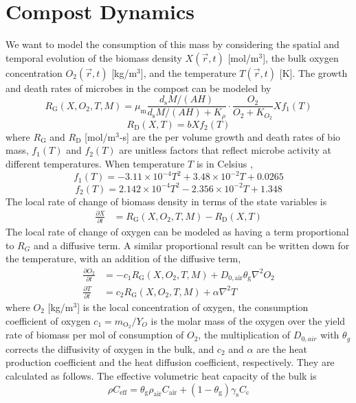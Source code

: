 \documentclass[12pt, letterpaper, titlepage]{article}
\begin{document}
\section{Compost Dynamics}
We want to model the consumption of this mass by considering the spatial and temporal evolution of the biomass density $X(\vec{r}, t)$ [mol/m$^3$], the bulk oxygen concentration $O_2(\vec{r}, t)$ [kg/m$^3$], and the temperature $T(\vec{r}, t)$ [K].
The growth and death rates of microbes in the compost can be modeled by \cite{lin}
$$R_{\mathrm{G}}(X, O_2, T, M) = \mu_{\mathrm{m}}\frac{d_{\mathrm{s}}M/(AH)}{d_{\mathrm{s}}M/(AH)+K_{\rho}}\cdot\frac{O_2}{O_2+K_{O_2}}Xf_1(T)$$
$$R_{\mathrm{D}}(X, T) = bXf_2(T)$$
where $R_{\mathrm{G}}$ and $R_{\mathrm{D}}$ [mol/m$^3$-s] are the per volume growth and death rates of bio mass, $f_1(T)$ and $f_2(T)$ are unitless factors that reflect microbe activity at different temperatures. When temperature $T$ is in Celsius \cite{lin}, 
$$f_1(T) = -3.11 \times 10^{-4}T^2+3.48\times10^{-2}T+0.0265$$
$$f_2(T) = 2.142\times 10^{-4}T^2-2.356\times10^{-2}T+1.348$$
The local rate of change of biomass density in terms of the state variables is \cite{lin}
    \begin{align}
        \frac{\partial X}{\partial t}&=R_{\mathrm{G}}(X, O_2, T, M)-R_{\mathrm{D}}(X, T) \label{dXdt}
    \end{align}
The local rate of change of oxygen can be modeled as having a term proportional to $R_G$ \cite{lin} and a diffusive term. A similar proportional result can be written down for the temperature, with an addition of the diffusive term,
    \begin{align}
        \frac{\partial O_2}{\partial t} &= -c_1R_{\mathrm{G}}(X, O_2, T, M)+D_{0,\mathrm{air}}\theta_{\mathrm{g}}\nabla^2O_2 \\
        \frac{\partial T}{\partial t} &= c_2R_{\mathrm{G}}(X, O_2, T, M)+\alpha\nabla^2T
    \end{align}
where $O_2$ [kg/m$^3$] is the local concentration of oxygen, the consumption coefficient of oxygen $c_1 = m_{\mathrm{O_2}}/{Y_O}$ is the molar mass of the oxygen over the yield rate of biomass per mol of consumption of $O_2$, the multiplication of $D_{0, air}$ with $\theta_{g}$ \cite{D0air} corrects the diffusivity of oxygen in the bulk, and $c_2$ and $\alpha$ are the heat production coefficient and the heat diffusion coefficient, respectively. They are calculated as follows. The effective volumetric heat capacity of the bulk is \cite{burning} $$\rho C_{\mathrm{eff}} = \theta_{\mathrm{g}}\rho_{\mathrm{air}}C_{\mathrm{air}}+(1-\theta_{\mathrm{g}})\gamma_{\mathrm{s}}C_{\mathrm{c}}$$
\end{document}
